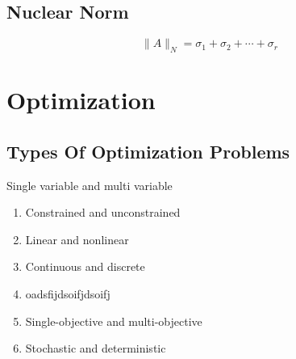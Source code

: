 \documentclass[11pt]{report}
\begin{document}
\section{Nuclear Norm}
\label{sec:org9b60fb6}

$$\|A\|_N = \sigma_1 + \sigma_2 + \cdots + \sigma_r$$
\chapter{Optimization}
\label{sec:org63a9021}
\section{Types Of Optimization Problems}
\label{sec:org34433ea}
Single variable and multi variable
\begin{enumerate}
\item Constrained and unconstrained
\item Linear and nonlinear
\item Continuous and discrete
\item oadsfijdsoifjdsoifj
\item Single-objective and multi-objective
\item Stochastic and deterministic
\end{enumerate}
\end{document}
